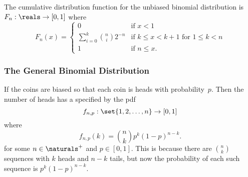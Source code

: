 The cumulative distribution function for the unbiased binomial
distribution is $F_n: \reals \to [0, 1]$ where
\begin{equation*}
F_n(x) =
    \begin{cases}
        0 & \text{if $x < 1$} \\
        \sum_{i = 0}^k \binom{n}{i} 2^{-n}
            & \text{if $k \le x < k + 1$ for $1 \le k < n$} \\
        1 & \text{if $n \le x$}.
    \end{cases}
\end{equation*}


\subsubsection{The General Binomial Distribution}

  If the coins are biased
so that each coin is heads with probability~$p$.  Then the number of
heads has a  specified by the
pdf
\begin{equation*}
    f_{n,p} : \set{1, 2, \dots, n} \to [0, 1]
\end{equation*}
where
\[
    f_{n, p}(k) = \binom{n}{k} p^k (1-p)^{n-k}.
\]
for some $n \in \naturals^+$ and $p \in [0, 1]$.  This is because
there are $\binom{n}{k}$ sequences with $k$ heads and $n - k$ tails,
but now the probability of each such sequence is $p^k (1-p)^{n-k}$.

